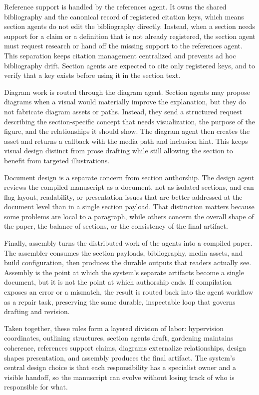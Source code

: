 Reference support is handled by the references agent. It owns the shared bibliography and the canonical record of registered citation keys, which means section agents do not edit the bibliography directly. Instead, when a section needs support for a claim or a definition that is not already registered, the section agent must request research or hand off the missing support to the references agent. This separation keeps citation management centralized and prevents ad hoc bibliography drift. Section agents are expected to cite only registered keys, and to verify that a key exists before using it in the section text.

Diagram work is routed through the diagram agent. Section agents may propose diagrams when a visual would materially improve the explanation, but they do not fabricate diagram assets or paths. Instead, they send a structured request describing the section-specific concept that needs visualization, the purpose of the figure, and the relationships it should show. The diagram agent then creates the asset and returns a callback with the media path and inclusion hint. This keeps visual design distinct from prose drafting while still allowing the section to benefit from targeted illustrations.

Document design is a separate concern from section authorship. The design agent reviews the compiled manuscript as a document, not as isolated sections, and can flag layout, readability, or presentation issues that are better addressed at the document level than in a single section payload. That distinction matters because some problems are local to a paragraph, while others concern the overall shape of the paper, the balance of sections, or the consistency of the final artifact.

Finally, assembly turns the distributed work of the agents into a compiled paper. The assembler consumes the section payloads, bibliography, media assets, and build configuration, then produces the durable outputs that readers actually see. Assembly is the point at which the system's separate artifacts become a single document, but it is not the point at which authorship ends. If compilation exposes an error or a mismatch, the result is routed back into the agent workflow as a repair task, preserving the same durable, inspectable loop that governs drafting and revision.

Taken together, these roles form a layered division of labor: hypervision coordinates, outlining structures, section agents draft, gardening maintains coherence, references support claims, diagrams externalize relationships, design shapes presentation, and assembly produces the final artifact. The system's central design choice is that each responsibility has a specialist owner and a visible handoff, so the manuscript can evolve without losing track of who is responsible for what.
